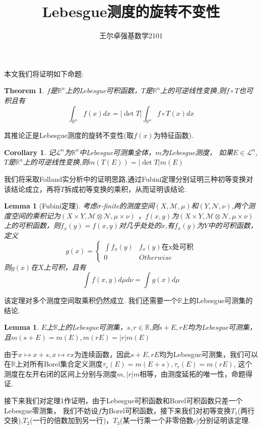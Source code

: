\documentclass[a4paper,12pt]{ctexart}
\title{Lebesgue测度的旋转不变性}
\author{王尔卓\quad 强基数学2101}
\newenvironment{prooff}{{\noindent\it\textcolor{cyan!40!black}{Proof}:}\quad}{\par}
\newcommand{\bb}[1]{\mathbb{#1}}
\newtheorem{coro}[defn]{Corollary}
\newtheorem{theo}[defn]{Theorem}
\newtheorem{lem}[defn]{Lemma}
\begin{document}
\maketitle
本文我们将证明如下命题:
\begin{theo}
    $f$是$\mathbb{R}^n$上的Lebesgue可积函数，$T$是$\mathbb{R}^n$上的可逆线性变换,则$f\circ T$也可积且有
    \begin{equation*}
        \int_{\mathbb{R}^n} f(x) dx=|\det T|\int_{\mathbb{R}^n} f\circ T(x)dx
    \end{equation*}
\end{theo}
其推论正是Lebesgue测度的旋转不变性(取$f(x)$为特征函数).
\begin{coro}
    记$\mathcal{L}^n$为$\mathbb{R}^n$中Lebesgue可测集全体，$m$为Lebesgue测度，
    如果$E\in \mathcal{L}^n$,$T$是$\mathbb{R}^n$上的可逆线性变换,则$m(T(E))=|\det T|m(E)$
\end{coro}
我们将采取Folland实分析中的证明思路,通过Fubini定理分别证明三种初等变换对该结论成立，再将$T$拆成初等变换的乘积，从而证明该结论.
\begin{lem}[Fubini定理]
    考虑$\sigma$-finite的测度空间$(X,\mathcal{M},\mu)$和$(Y,\mathcal{N},\nu )$,两个测度空间的乘积记为$(X\times Y,\mathcal{M}\otimes\mathcal{N},\mu\times \nu)$
    ，$f(x,y)$为$(X\times Y,\mathcal{M}\otimes\mathcal{N},\mu\times \nu)$上的可积函数，则$f_x(y)=f(x,y)$对几乎处处的$x$,有$f_x(y)$为$Y$中的可积函数，定义
    \begin{equation*}
        g(x)=\begin{cases}
            \int f_x(y) & f_x(y) \text{在x处可积} \\
            0 \quad     & Otherwise
        \end{cases}
    \end{equation*}
    则$g(x)$在$X$上可积，且有
    \begin{equation*}
        \int f(x,y)d\mu d\nu =\int g(x) d\mu
    \end{equation*}
\end{lem}
该定理对多个测度空间取乘积仍然成立.
我们还需要一个$\mathbb{R}$上的Lebesgue可测集的结论.
\begin{lem}
    \label{平移不变性}
    $E$上$\mathbb{R}$上的Lebesgue可测集，$s,r\in \bb{R}$,则$s+E,rE$均为Lebesgue可测集，且$m(s+E)=m(E),m(rE)=|r|m(E)$
\end{lem}
\begin{prooff}
    由于$x\mapsto x+s,x\mapsto rx$为连续函数，因此$s+E,rE$均为Lebesgue可测集，我们可以在$\mathbb{R}$上对所有Borel集合定义测度$\tau_s(E)=m(E+s),\tau_r(E)=m(rE)$,
    这个测度在左开右闭的区间上分别与测度$m,|r|m$相等，由测度延拓的唯一性，命题得证.
\end{prooff}
接下来我们对定理1作证明，由于Lebesgue可积函数和Borel可积函数只差一个Lebesgue零测集，
我们不妨设$f$为Borel可积函数，接下来我们对初等变换$T_1$(两行交换),$T_2$(一行的倍数加到另一行)，$T_3$(某一行乘一个非零倍数$c$)分别证明该定理.
\end{document}
